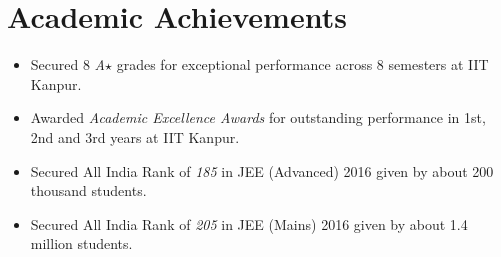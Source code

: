 \section*{Academic Achievements}
\begin{itemize}

\setlength\itemsep{0pt}
\item Secured 8 \textit{A$\star$} grades for exceptional performance across 8 semesters at IIT Kanpur.
\item Awarded \textit{Academic Excellence Awards} for outstanding performance in 1st, 2nd and 3rd years at IIT Kanpur.
\item Secured All India Rank of \textit{185} in JEE (Advanced) 2016 given by about 200 thousand students.
\item Secured All India Rank of \textit{205} in JEE (Mains) 2016 given by about 1.4 million students.

\end{itemize}
